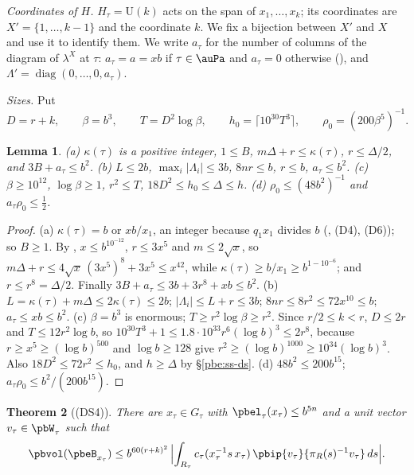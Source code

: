 \documentclass[10pt]{amsart}
\newtheorem{theorem}{Theorem}[section]
\newtheorem{lemma}[theorem]{Lemma}
\theoremstyle{definition}
\theoremstyle{remark}
\providecommand{\auU}{\mathrm U}
\begin{document}
\emph{Coordinates of $H$.} $H_\tau=\auU(k)$ acts on the span of $x_1,\dots,x_k$; its coordinates are
$X'=\{1,\dots,k-1\}$ and the coordinate $k$. We fix a bijection between $X'$ and $X$ and use it to
identify them. We write $a_\tau$ for the number of columns of the diagram of $\lambda^X$ at $\tau$:
$a_\tau=a=xb$ if $\tau\in\auPa$ and $a_\tau=0$ otherwise ({\cite[\S14.3]{P46}}), and
$\Lambda'=\operatorname{diag}(0,\dots,0,a_\tau)$.

\emph{Sizes.} Put
\begin{equation}\label{pbp:eq-T}
D=r+k,\qquad\beta=b^3,\qquad T=D^2\log\beta,\qquad h_0=\lceil10^{30}T^3\rceil,\qquad
\rho_0=(200\beta^5)^{-1}.
\end{equation}

\begin{lemma}\label{pbp:sizes}
\textup{(a)} $\kappa(\tau)$ is a positive integer, $1\le B$, $m\Delta+r\le\kappa(\tau)$,
$r\le\Delta/2$, and $3B+a_\tau\le b^2$. \textup{(b)} $L\le2b$, $\max_i|\Lambda_i|\le3b$, $8nr\le b$,
$r\le b$, $a_\tau\le b^2$. \textup{(c)} $\beta\ge10^{12}$, $\log\beta\ge1$, $r^2\le T$,
$18D^2\le h_0\le\Delta\le h$. \textup{(d)} $\rho_0\le(48b^2)^{-1}$ and $a_\tau\rho_0\le\frac12$.
\end{lemma}
\begin{proof}
(a) $\kappa(\tau)=b$ or $xb/x_1$, an integer because $q_1x_1$ divides $b$ ({\cite[Definition~13.3]{P46}},
(D4), (D6)); so $B\ge1$. By {\cite[(36)]{P46}}, $x\le b^{10^{-12}}$, $r\le3x^5$
and $m\le2\sqrt x$, so $m\Delta+r\le4\sqrt x\,(3x^5)^8+3x^5\le x^{42}$, while $\kappa(\tau)\ge b/x_1
\ge b^{1-10^{-6}}$; and $r\le r^8=\Delta/2$. Finally $3B+a_\tau\le3b+3r^8+xb\le b^2$.
(b) $L=\kappa(\tau)+m\Delta\le2\kappa(\tau)\le2b$; $|\Lambda_i|\le L+r\le3b$; $8nr\le8r^2\le
72x^{10}\le b$; $a_\tau\le xb\le b^2$.
(c) $\beta=b^3$ is enormous; $T\ge r^2\log\beta\ge r^2$. Since $r/2\le k<r$, $D\le2r$ and $T\le
12r^2\log b$, so $10^{30}T^3+1\le1.8\cdot10^{33}r^6(\log b)^3\le2r^8$, because $r\ge x^5\ge
(\log b)^{500}$ and $\log b\ge128$ give $r^2\ge(\log b)^{1000}\ge10^{34}(\log b)^3$. Also $18D^2\le
72r^2\le h_0$, and $h\ge\Delta$ by \S\ref{pbe:ss-ds}.
(d) $48b^2\le200b^{15}$; $a_\tau\rho_0\le b^2/(200b^{15})$.
\end{proof}

\begin{theorem}[\textup{(DS4)}]\label{pbp:main}
There are $x_\tau\in G_\tau$ with $\pbel_\tau(x_\tau)\le b^{5n}$ and a unit vector $v_\tau\in
\pbW_\tau$ such that
\[
\pbvol(\pbeB_{x_\tau})\le b^{60(r+k)^2}\,\Bigl|\int_{R_\tau}c_\tau(x_\tau^{-1}s\,x_\tau)\,
\pbip{v_\tau}{\pi_R(s)^{-1}v_\tau}\,ds\Bigr| .
\]
\end{theorem}
\end{document}
